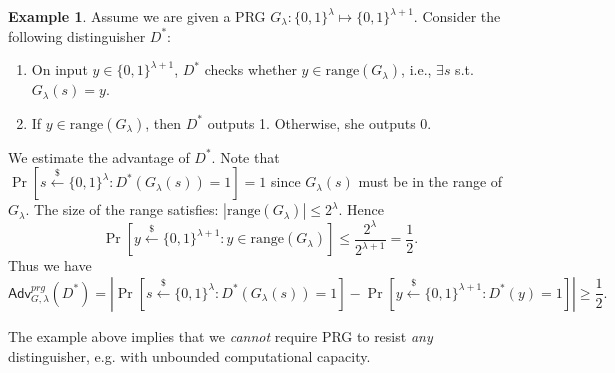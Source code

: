 \documentclass[12pt]{article}
\newcommand{\bits}{\{0,1\}}
\newcommand{\getsr}{\stackrel{\$}{\gets}}
\newcommand{\Adv}{\textsf{Adv}}
\theoremstyle{definition}
\newtheorem{example}[theorem]{Example}
\begin{document}
\begin{example}
Assume we are given a PRG $G_\lambda : \bits^\lambda \mapsto \bits^{\lambda+1}$. Consider the following distinguisher $D^*$: 
\begin{enumerate}
\item On input $y\in \bits^{\lambda+1}$, $D^*$ checks whether $y\in\mathrm{range}(G_\lambda)$, i.e., $\exists s$ s.t. $G_\lambda(s) = y$.
\item If $y\in\mathrm{range}(G_\lambda)$, then $D^*$ outputs 1. Otherwise, she outputs 0.
\end{enumerate}
We estimate the advantage of $D^*$. Note that $\Pr[s\getsr\bits^\lambda: D^*(G_\lambda(s))=1]=1$ since $G_\lambda(s)$ must be in the range of $G_\lambda$. The size of the range satisfies: $|\mathrm{range}(G_\lambda)|\leq 2^{\lambda}$. Hence
$$\Pr[y\getsr \bits^{\lambda+1}: y\in\mathrm{range}(G_\lambda)] \leq \frac{2^\lambda}{2^{\lambda+1}}=\frac{1}{2}.$$
Thus we have
$$\Adv_{G,\lambda}^{prg}(D^*) = \left| \Pr[s\getsr\bits^\lambda: D^*(G_\lambda(s))=1] - \Pr[y\getsr\bits^{\lambda+1}:D^*(y)=1] \right| \geq \frac{1}{2}.$$
\end{example}
The example above implies that we \emph{cannot} require PRG to resist \emph{any} distinguisher, e.g. with unbounded computational capacity.
\end{document}
